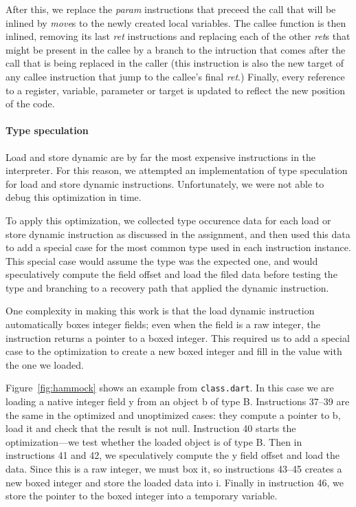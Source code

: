 \documentclass[10pt,twocolumn]{article}
\begin{document}
After this, we replace the \emph{param} instructions that preceed the call that will be inlined by \emph{move}s to the newly created local variables. The callee function is then
inlined, removing its last \emph{ret} instructions and replacing each of the other \emph{ret}s that might be present in the callee by a branch to the intruction that comes after
the call that is being replaced in the caller (this instruction is also the new target of any callee instruction that jump to the callee's final \emph{ret}.) Finally, every reference to a register, variable, parameter or target is updated to reflect the new position of the code.

\paragraph{Type speculation}

Load and store dynamic are by far the most expensive instructions in
the interpreter. For this reason, we attempted an implementation of
type speculation for load and store dynamic
instructions. Unfortunately, we were not able to debug this
optimization in time.

To apply this optimization, we collected type occurence data for each
load or store dynamic instruction as discussed in the assignment, and
then used this data to add a special case for the most common type
used in each instruction instance. This special case would assume the
type was the expected one, and would speculatively compute the field
offset and load the filed data before testing the type and branching
to a recovery path that applied the dynamic instruction. 

One complexity in making this work is that the load dynamic
instruction automatically boxes integer fields; even when the field is
a raw integer, the instruction returns a pointer to a boxed
integer. This required us to add a special case to the optimization to
create a new boxed integer and fill in the value with the one we
loaded.

Figure~\ref{fig:hammock} shows an example from \texttt{class.dart}. In this
case we are loading a native integer field y from an object b of type
B. Instructions 37--39 are the same in the optimized and unoptimized
cases: they compute a pointer to b, load it and check that the result
is not null. Instruction 40 starts the optimization---we test whether
the loaded object is of type B. Then in instructions 41 and 42, we
speculatively compute the y field offset and load the data. Since this
is a raw integer, we must box it, so instructions 43--45 creates a new
boxed integer and store the loaded data into i. Finally in instruction
46, we store the pointer to the boxed integer into a temporary variable. 
\end{document}
